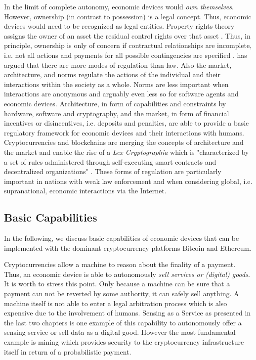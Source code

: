 In the limit of complete autonomy, economic devices would \emph{own themselves}. However, ownership (in contrast to possession) is a legal concept. Thus, economic devices would need to be recognized as legal entities. Property rights theory assigns the owner of an asset the residual control rights over that asset \parencite{10.2307/2937753}. Thus, in principle, ownership is only of concern if contractual relationships are incomplete, i.e. not all actions and payments for all possible contingencies are specified \parencite{GKlein:2015en}. \cite{lessig2009code} has argued that there are more modes of regulation than law. Also the market, architecture, and norms regulate the actions of the individual and their interactions within the society as a whole. Norms are less important when interactions are anonymous and arguably even less so for software agents and economic devices. Architecture, in form of capabilities and constraints by hardware, software and cryptography, and the market, in form of financial incentives or disincentives, i.e. deposits and penalties, are able to provide a basic regulatory framework for economic devices and their interactions with humans. Cryptocurrencies and blockchains are merging the concepts of architecture and the market and enable the rise of a \emph{Lex Cryptographia} which is "characterized by a set of rules administered through self-executing smart contracts and decentralized organizations" \parencite{wright2015decentralized}.
These forms of regulation are particularly important in nations with weak law enforcement and when considering global, i.e. supranational, economic interactions via the Internet.

\subsection{Basic Capabilities}

In the following, we discuss basic capabilities of economic devices that can be implemented with the dominant cryptocurrency platforms Bitcoin and Ethereum.

Cryptocurrencies allow a machine to reason about the finality of a payment. Thus, an economic device is able to autonomously \emph{sell services or (digital) goods}. It is worth to stress this point. Only because a machine can be sure that a payment can not be reverted by some authority, it can safely sell anything. A machine itself is not able to enter a legal arbitration process which is also expensive due to the involvement of humans. Sensing as a Service as presented in the last two chapters is one example of this capability to autonomously offer a sensing service or sell data as a digital good. However the most fundamental example is mining which provides security to the cryptocurrency infrastructure itself in return of a probabilistic payment. 

